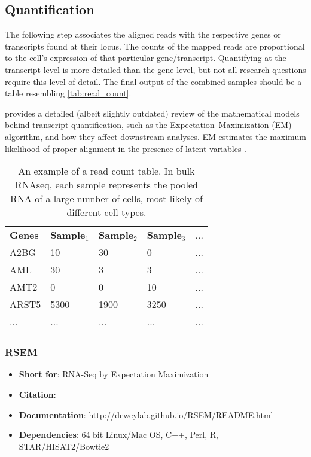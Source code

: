 
\subsection{Quantification}
\label{quantification}
The following step associates the aligned reads with the respective genes or transcripts found at their locus. The counts of the mapped reads are proportional to the cell's expression of that particular gene/transcript. Quantifying at the transcript-level is more detailed than the gene-level, but not all research questions require this level of detail. The final output of the combined samples should be a table resembling \autoref{tab:read_count}.

\cite{pachter2011models} provides a detailed (albeit slightly outdated) review of the mathematical models behind transcript quantification, such as the Expectation–Maximization (EM) algorithm, and how they affect downstream analyses. EM estimates the maximum likelihood of proper alignment in the presence of latent variables \citep{brownlee2019gentle, pachter2011models}.

\begin{table}[h]
\centering
\caption{An example of a read count table. In bulk RNAseq, each sample represents the pooled RNA of a large number of cells, most likely of different cell types.}
\label{tab:read_count}
\begin{tabular}{lllll}
\textbf{Genes} & \textbf{Sample$_{1}$} & \textbf{Sample$_{2}$} & \textbf{Sample$_{3}$} & ...  \\
A2BG  & 10      & 30      & 0       & ...  \\
AML   & 30      & 3       & 3       & ...  \\
AMT2  & 0       & 0       & 10      & ...  \\
ARST5 & 5300    & 1900    & 3250    & ...  \\
...   & ...     & ...     & ...     & ... 
\end{tabular}
\end{table}

\subsubsection{RSEM}
\begin{itemize}\itemsep-0.5em
\item[] \textbf{Short for}: RNA-Seq by Expectation Maximization
\item[] \textbf{Citation}: 				\cite{li2011rsem}
\item[] \textbf{Documentation}: 	\url{http://deweylab.github.io/RSEM/README.html}
\item[] \textbf{Dependencies}: 64 bit Linux/Mac OS, C++, Perl, R, STAR/HISAT2/Bowtie2
\end{itemize}

